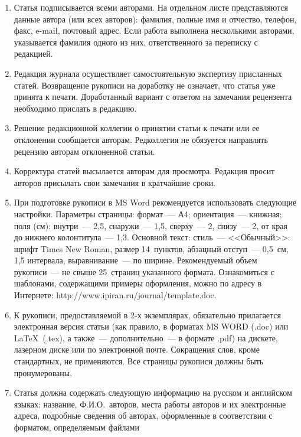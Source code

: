 {{\begin{enumerate}
Указанное соглашение может быть представлено как в бумажном виде, так и в виде 
отсканированной копии (с подписями авторов).

Редколлегия вправе запросить у авторов экспертное заключение о возможности
опубликования представленной статьи в открытой печати.
\item Статья
подписывается всеми авторами. На отдельном листе представляются данные автора
(или всех авторов): фамилия, полные имя и отчество, телефон, факс, e-mail,
почтовый адрес. Если работа выполнена несколькими авторами, указывается фамилия
одного из них, ответственного за переписку с редакцией.
\item Редакция журнала
осуществляет самостоятельную экспертизу присланных статей. Возвращение рукописи
на доработку не означает, что статья уже принята к печати. Доработанный вариант
с ответом на замечания рецензента необходимо прислать в редакцию.
\item Решение
редакционной коллегии о принятии статьи к печати или ее отклонении сообщается
авторам. Редколлегия не обязуется направлять рецензию авторам отклоненной
статьи.
\item Корректура статей высылается авторам для просмотра. Редакция
просит авторов присылать свои замечания в кратчайшие сроки.
\item При
подготовке рукописи в MS Word рекомендуется использовать следующие настройки.
Параметры страницы: формат~--- А4; ориентация~--- книжная; поля (см): внутри~---
2,5, снаружи~--- 1,5, сверху~--- 2, снизу~--- 2, от края до нижнего
колонтитула~--- 1,3. Основной текст: стиль~--- <<Обычный>>: шрифт Times New
Roman, размер 14~пунктов, абзацный отступ~--- 0,5~см, 1,5 интервала,
выравнивание~--- по ширине. Рекомендуемый объем рукописи~--- не свыше
25~страниц указанного формата. Ознакомиться с шаблонами, содержащими примеры
оформления, можно по адресу в Интернете:
\textsf{http://www.ipiran.ru/journal/template.doc}.
\item К рукописи, предоставляемой в 2-х
экземплярах, обязательно прилагается электронная версия статьи (как правило, в
форматах MS WORD (.doc) или \LaTeX\  (.tex), а также~--- дополнительно~--- в
формате .pdf) на дискете, лазерном диске или по электронной почте. Сокращения
слов, кроме стандартных, не применяются. Все страницы рукописи должны быть
пронумерованы.
\item Статья должна содержать следующую информацию на русском и
английском языках: название, Ф.И.О.\ авторов, места работы авторов и их
электронные адреса,
подробные сведения об авторах, оформленные в соответствии с форматом, определяемым файлами


\end{enumerate}}}
